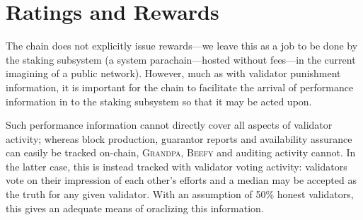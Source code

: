 \section{Ratings and Rewards}\label{sec:ratings}

The \Jam chain does not explicitly issue rewards---we leave this as a job to be done by the staking subsystem (a system parachain---hosted without fees---in the current imagining of a public \Jam network). However, much as with validator punishment information, it is important for the \Jam chain to facilitate the arrival of performance information in to the staking subsystem so that it may be acted upon.

Such performance information cannot directly cover all aspects of validator activity; whereas block production, guarantor reports and availability assurance can easily be tracked on-chain, \textsc{Grandpa}, \textsc{Beefy} and auditing activity cannot. In the latter case, this is instead tracked with validator voting activity: validators vote on their impression of each other's efforts and a median may be accepted as the truth for any given validator. With an assumption of 50\% honest validators, this gives an adequate means of oraclizing this information.

